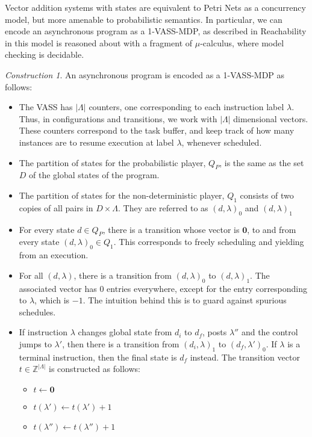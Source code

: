 \documentclass{article}
\theoremstyle{remark}
\newtheorem{construction}{Construction}[section]
\newcommand{\integers}{\mathbb{Z}}
\begin{document}
Vector addition systems with states are equivalent to Petri Nets as a concurrency model, but more amenable to probabilistic semantics. In particular, we can encode an asynchronous program as a 1-VASS-MDP, as described in \cite[Definition 2.2]{abdulla2016qualitative} Reachability in this model is reasoned about with a fragment of $\mu$-calculus, where model checking is decidable.

\begin{construction}
An asynchronous program is encoded as a 1-VASS-MDP as follows:
\begin{itemize}

\item The VASS has $|\Lambda|$ counters, one corresponding to each instruction label $\lambda$. Thus, in configurations and transitions, we work with $|\Lambda|$ dimensional vectors. These counters correspond to the task buffer, and keep track of how many instances are to resume execution at label $\lambda$, whenever scheduled.
\item The partition of states for the probabilistic player, $Q_P$, is the same as the set $D$ of the global states of the program.
\item The partition of states for the non-deterministic player, $Q_1$ consists of two copies of all pairs in $D \times \Lambda$. They are referred to as $(d, \lambda)_0$ and $(d, \lambda)_1$ 
\item For every state $d \in Q_P$, there is a transition whose vector is $\mathbf{0}$, to and from every state $(d, \lambda)_0 \in Q_1$. This corresponds to freely scheduling and yielding from an execution.
\item For all $(d, \lambda)$, there is a transition from $(d, \lambda)_0$ to $(d, \lambda)_1$. The associated vector has $0$ entries everywhere, except for the entry corresponding to $\lambda$, which is $-1$. The intuition behind this is to guard against spurious schedules.
\item If instruction $\lambda$ changes global state from $d_i$ to $d_f$, posts $\lambda''$ and the control jumps to $\lambda'$, then there is a transition from $(d_i, \lambda)_1$ to $(d_f, \lambda')_0$. If $\lambda$ is a terminal instruction, then the final state is $d_f$ instead. The transition vector $t \in \integers^{|\Lambda|}$ is constructed as follows:
\begin{itemize}
\item $t \gets \mathbf{0}$
\item $ t(\lambda') \gets t(\lambda') + 1$
\item  $t(\lambda'') \gets t(\lambda'') + 1$
\end{itemize}
\end{itemize}
\end{construction}




\end{document}
